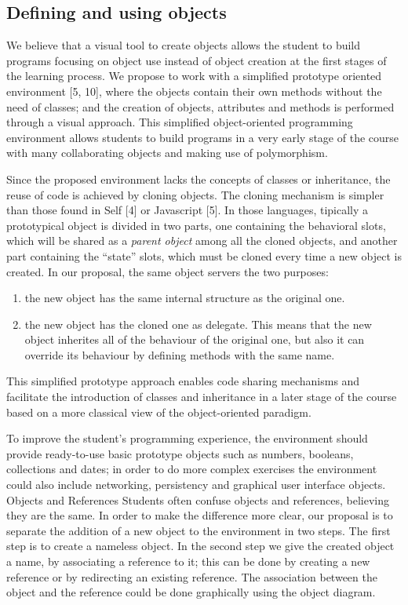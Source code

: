 \documentclass{sigplanconf}
\begin{document}
\subsection{Defining and using objects}
We believe that a visual tool to create objects allows the student to build programs focusing on object use instead of object creation at the first stages of the learning process. We propose to work with a simplified prototype oriented environment [5, 10], where the objects contain their own methods without the need of classes; and the creation of objects, attributes and methods is performed through a visual approach. This simplified object-oriented programming environment allows students to build programs in a very early stage of the course with many collaborating objects and making use of polymorphism.

Since the proposed environment lacks the concepts of classes or inheritance, the
reuse of code is achieved by cloning objects. The cloning mechanism is simpler
than those found in Self [4] or Javascript [5]. In those languages, tipically a
prototypical object is divided in two parts, one containing the behavioral
slots, which will be shared as a \textit{parent object} among all the cloned
objects, and another part containing the ``state'' slots, which must be cloned every time a new object is created. In our proposal, the same object servers the two purposes: 
\begin{enumerate}
\item the new object has the same internal structure as the original one. 
\item the new object has the cloned one as delegate. This means that the new
object inherites all of the behaviour of the original one, but also it can override its behaviour by defining methods with the same name.
\end{enumerate}

This simplified prototype approach enables code sharing mechanisms and facilitate the introduction of classes and inheritance in a later stage of the course based on a more classical view of the object-oriented paradigm.

To improve the student’s programming experience, the environment should provide ready-to-use basic prototype objects such as numbers, booleans, collections and dates; in order to do more complex exercises the environment could also include networking, persistency and graphical user interface objects.
Objects and References
Students often confuse objects and references, believing they are the same. In order to make the difference more clear, our proposal is to separate the addition of a new object to the environment in two steps. The first step is to create a nameless object. In the second step we give the created object a name, by associating a reference to it; this can be done by creating a new reference or by redirecting an existing reference. The association between the object and the reference could be done graphically using the object diagram. 
\end{document}
